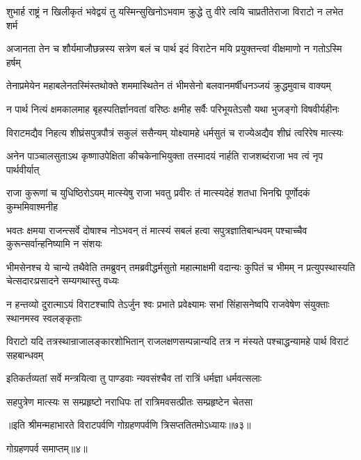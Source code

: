 \twolineshloka
{शुभार्ह राष्ट्रं न खिलीकृतं भवेद्वयं तु यस्मिन्सुखिनोऽभवाम}
{क्रुद्धे तु वीरे त्वयि चाप्रतीतेराजा विराटो न लभेत शर्म}


\twolineshloka
{अजानता तेन च शौर्यमाजौछन्नस्य सत्रेण बलं च पार्थ}
{इदं विराटेन मयि प्रयुक्तन्त्वां वीक्षमाणो न गतोऽस्मि हर्षम्}


\twolineshloka
{तेनाप्रमेयेन महाबलेनतस्मिंस्तथोक्ते शममास्थितेन}
{तं भीमसेनो बलवानमर्षीधनञ्जयं क्रुद्धमुवाच वाक्यम्}


\fourlineindentedshloka
{न पार्थ नित्यं क्षमकालमाह}
{बृहस्पतिर्ज्ञानवतां वरिष्ठः}
{क्षमीह सर्वैः परिभूयतेऽसौ}
{यथा भुजङ्गो विषवीर्यहीनः}


\twolineshloka
{विराटमद्यैव निहत्य शीघ्रंसपुत्रपौत्रं सकुलं ससैन्यम्}
{योक्ष्यामहे धर्मसुतं च राज्येअद्यैव शीघ्रं त्वरिरेष मात्स्यः}


\twolineshloka
{अनेन पाञ्चालसुताऽथ कृष्णाउपेक्षिता कीचकेनाभियुक्ता}
{तस्मादयं नार्हति राजशब्दंराजा भव त्वं नृप पार्थवीर्यात्}


\fourlineindentedshloka
{राजा कुरूणां च युधिष्ठिरोऽयम्}
{मात्स्येषु राजा भवतु प्रवीरः}
{तं मात्स्यदेहं शतधा भिनद्मि}
{पूर्णोदकं कुम्भमिवाश्मनीह}




\threelineshloka
{भवतः क्षमया राजन्त्सर्वे दोषाश्च नोऽभवन्}
{तं मात्स्यं सबलं हत्वा सपुत्रज्ञातिबान्धवम्}
{पश्चाच्चैव कुरून्सर्वान्हनिष्यामि न संशयः}


\onelineshloka
{भीमसेनश्च ये चान्ये तथैवेति तमब्रुवन्}
\twolineshloka
{तमब्रवीद्धर्मसुतो महात्माक्षमी वदान्यः कुपितं च भीमम्}
{न प्रत्युपस्थास्यति चेत्सदारःप्रसादने सम्यगथास्तु वध्यः}


\onelineshloka
{न हन्तव्यो दुरात्माऽयं विराटश्चापि तेऽर्जुन}
\twolineshloka
{श्वः प्रभाते प्रवेक्ष्यामः सभां सिंहासनेष्वपि}
{राजवेषेण संयुक्ताः स्थानमस्व स्वलङ्कृताः}


\threelineshloka
{विराटो यदि तत्रस्थान्राजालङ्कारशोभितान्}
{राजलक्षणसम्पन्नान्यदि तत्र न मंस्यते}
{पश्चाद्धन्यामहे पार्थ विराटं सहबान्धवम्}


\twolineshloka
{इतिकर्तव्यतां सर्वे मन्त्रयित्वा तु पाण्डवाः}
{न्यवसंश्चैव तां रात्रिं धर्मज्ञा धर्मवत्सलाः}


\twolineshloka
{सहपुत्रेण मात्स्यः स सम्प्रहृष्टो नराधिपः}
{तां रात्रिमवसत्प्रीतः सम्प्रहृष्टेन चेतसा}

॥इति श्रीमन्महाभारते विराटपर्वणि गोग्रहणपर्वणि त्रिसप्ततितमोऽध्यायः॥७३॥ 

गोग्रहणपर्व समाप्तम्॥४॥

